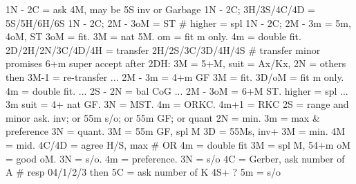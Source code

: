 1N -
2C = ask 4M, may be 5S inv or Garbage
    1N - 2C; 3H/3S/4C/4D = 5S/5H/6H/6S
    1N - 2C; 2M - 3oM = ST  # higher = spl
    1N - 2C; 2M - 3m = 5m, 4oM, ST
        3oM = fit. 3M = nat 5M. om = fit m only. 4m = double fit.
2D/2H/2N/3C/4D/4H = transfer 2H/2S/3C/3D/4H/4S  # transfer minor promises 6+m
    super accept after 2DH: 3M = 5+M, suit = Ax/Kx, 2N = others
        then 3M-1 = re-transfer
    ... 2M - 3m = 4+m GF
        3M = fit. 3D/oM = fit m only. 4m = double fit.
    ... 2S - 2N = bal CoG
    ... 2M - 3oM = 6+M ST. higher = spl
    ... 3m
        suit = 4+ nat GF. 3N = MST. 4m = ORKC. 4m+1 = RKC
2S = range and minor ask. inv; or 55m s/o; or 55m GF; or quant
    2N = min. 3m = max & preference
        3N = quant. 3M = 55m GF, spl M
3D = 55Ms, inv+
    3M = min. 4M = mid. 4C/4D = agree H/S, max  # OR 4m = double fit
3M = spl M, 54+m
    oM = good oM. 3N = s/o. 4m = preference.
3N = s/o
4C = Gerber, ask number of A  # resp 04/1/2/3
    then 5C = ask number of K
4S+ ?
5m = s/o